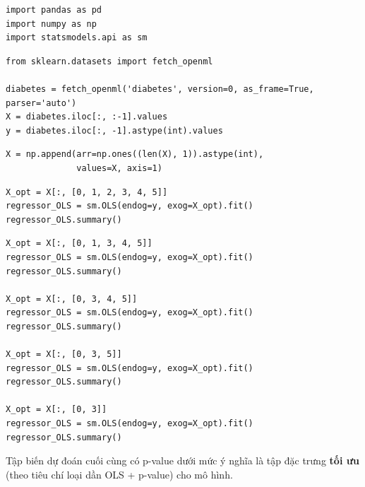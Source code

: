 \begin{vidu}[title={Bước 1 --- Import}]
\begin{lstlisting}
import pandas as pd
import numpy as np
import statsmodels.api as sm
\end{lstlisting}
\end{vidu}

\begin{vidu}[title={Bước 2 --- Nạp dữ liệu diabetes}]
\begin{lstlisting}
from sklearn.datasets import fetch_openml

diabetes = fetch_openml('diabetes', version=0, as_frame=True, parser='auto')
X = diabetes.iloc[:, :-1].values
y = diabetes.iloc[:, -1].astype(int).values
\end{lstlisting}
\end{vidu}

\begin{vidu}[title={Bước 3--4 --- Intercept}]
\begin{lstlisting}
X = np.append(arr=np.ones((len(X), 1)).astype(int),
              values=X, axis=1)
\end{lstlisting}
\end{vidu}

\begin{vidu}[title={Bước 5 --- OLS với tất cả biến (ví dụ 6 biến đầu)}]
\begin{lstlisting}
X_opt = X[:, [0, 1, 2, 3, 4, 5]]
regressor_OLS = sm.OLS(endog=y, exog=X_opt).fit()
regressor_OLS.summary()
\end{lstlisting}
\end{vidu}

\begin{vidu}[title={Bước 6--7 --- Loại dần theo p-value}]
\begin{lstlisting}
X_opt = X[:, [0, 1, 3, 4, 5]]
regressor_OLS = sm.OLS(endog=y, exog=X_opt).fit()
regressor_OLS.summary()

X_opt = X[:, [0, 3, 4, 5]]
regressor_OLS = sm.OLS(endog=y, exog=X_opt).fit()
regressor_OLS.summary()

X_opt = X[:, [0, 3, 5]]
regressor_OLS = sm.OLS(endog=y, exog=X_opt).fit()
regressor_OLS.summary()

X_opt = X[:, [0, 3]]
regressor_OLS = sm.OLS(endog=y, exog=X_opt).fit()
regressor_OLS.summary()
\end{lstlisting}
\end{vidu}

\begin{ynghia}[title={Tập đặc trưng cuối}]
Tập biến dự đoán cuối cùng có p-value dưới mức ý nghĩa là tập đặc trưng \textbf{tối ưu} (theo tiêu chí loại dần OLS + p-value) cho mô hình.
\end{ynghia}

